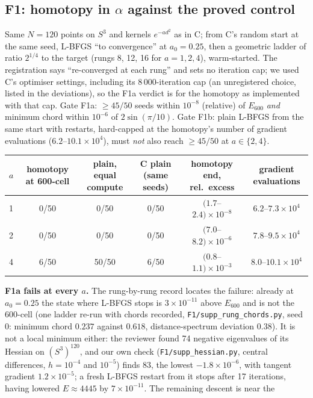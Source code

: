 \subsection{F1: homotopy in $\alpha$ against the proved control}\label{sec:F1}
Same $N=120$ points on $S^3$ and kernels $e^{-ad^2}$ as in C; from C's random start at the same seed, L-BFGS ``to convergence'' at
$a_0=0.25$, then a geometric ladder of ratio $2^{1/4}$ to the target (rungs 8, 12, 16 for $a=1,2,4$), warm-started. The registration
says ``re-converged at each rung'' and sets no iteration cap; we used C's optimiser settings, including its 8\,000-iteration cap
(an unregistered choice, listed in the deviations), so the F1a verdict is for the homotopy as implemented with that cap. Gate F1a: $\ge45/50$ seeds within $10^{-8}$ (relative) of $E_{600}$ \emph{and} minimum chord within $10^{-6}$ of
$2\sin(\pi/10)$. Gate F1b: plain L-BFGS from the same start with restarts, hard-capped at the homotopy's number of gradient
evaluations ($6.2$--$10.1\times10^4$), must \emph{not} also reach $\ge45/50$ at $a\in\{2,4\}$.
\begin{center}\small
\begin{tabular}{lccccc}\toprule
$a$ & homotopy at 600-cell & plain, equal compute & C plain (same seeds) & homotopy end, rel.\ excess & gradient evaluations\\\midrule
1 & 0/50 & 0/50 & 0/50 & $(1.7$--$2.4)\times10^{-8}$ & $6.2$--$7.3\times10^4$\\
2 & 0/50 & 0/50 & 0/50 & $(7.0$--$8.2)\times10^{-6}$ & $7.8$--$9.5\times10^4$\\
4 & 6/50 & 50/50 & 6/50 & $(0.8$--$1.1)\times10^{-3}$ & $8.0$--$10.1\times10^4$\\\bottomrule
\end{tabular}
\end{center}
\textbf{F1a fails at every $a$.} The rung-by-rung record locates the failure: already at $a_0=0.25$ the state where L-BFGS stops is
$3\times10^{-11}$ above $E_{600}$ and is not the 600-cell (one ladder re-run with chords recorded, \texttt{F1/supp\_rung\_chords.py},
seed 0: minimum chord $0.237$ against $0.618$, distance-spectrum deviation $0.38$). It is not a local minimum either: the reviewer
found 74 negative eigenvalues of its Hessian on $(S^3)^{120}$, and our own check (\texttt{F1/supp\_hessian.py}, central differences,
$h=10^{-4}$ and $10^{-5}$) finds 83, the lowest $-1.8\times10^{-6}$, with tangent gradient $1.2\times10^{-5}$; a fresh L-BFGS
restart from it stops after 17 iterations, having lowered $E\approx4445$ by $7\times10^{-11}$. The remaining descent is near the
